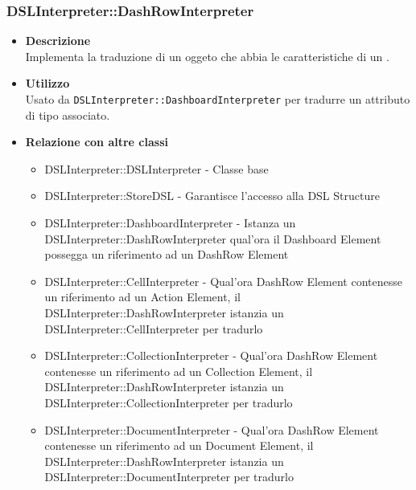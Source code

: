 \subsubsection{DSLInterpreter::DashRowInterpreter}
\begin{itemize}
\item \textbf{Descrizione} \hfill \\
Implementa la traduzione di un oggeto che abbia le caratteristiche di un .
\item \textbf{Utilizzo} \hfill \\
Usato da \texttt{DSLInterpreter::DashboardInterpreter} per tradurre un attributo di tipo  associato.
\item \textbf{Relazione con altre classi}
\begin{itemize}
\item DSLInterpreter::DSLInterpreter - Classe base
\item DSLInterpreter::StoreDSL - Garantisce l'accesso alla DSL Structure
\item DSLInterpreter::DashboardInterpreter - Istanza un DSLInterpreter::DashRowInterpreter qual'ora il Dashboard Element possegga un riferimento ad un DashRow Element
\item DSLInterpreter::CellInterpreter - Qual'ora DashRow Element contenesse un riferimento ad un Action Element, il DSLInterpreter::DashRowInterpreter istanzia un DSLInterpreter::CellInterpreter per tradurlo
\item DSLInterpreter::CollectionInterpreter - Qual'ora DashRow Element contenesse un riferimento ad un Collection Element, il DSLInterpreter::DashRowInterpreter istanzia un DSLInterpreter::CollectionInterpreter per tradurlo
\item DSLInterpreter::DocumentInterpreter - Qual'ora DashRow Element contenesse un riferimento ad un Document Element, il DSLInterpreter::DashRowInterpreter istanzia un DSLInterpreter::DocumentInterpreter per tradurlo
\end{itemize}
\end{itemize}

